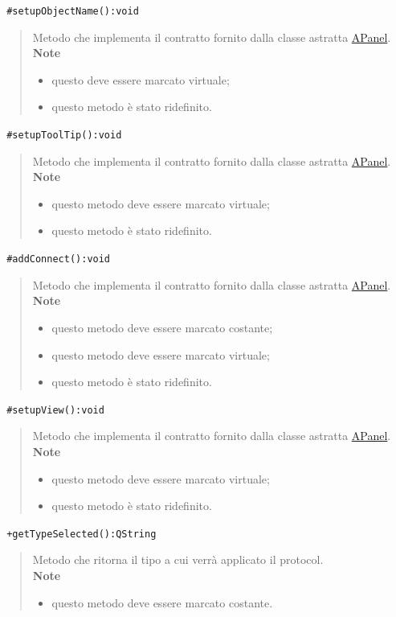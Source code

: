 \color{blue}\verb! #setupObjectName():void!
\begin{quote}
\color{black}Metodo che implementa il contratto fornito dalla classe astratta \hyperref[speAPanel]{APanel}.\\
 \textbf{Note}
 \begin{itemize}
  \item questo deve essere marcato virtuale;
 \item questo metodo è stato ridefinito.
 \end{itemize}
\end{quote} 
\color{blue}\verb! #setupToolTip():void!
\begin{quote}
\color{black}Metodo che implementa il contratto fornito dalla classe astratta \hyperref[speAPanel]{APanel}.\\
 \textbf{Note}
 \begin{itemize}
 \item questo metodo deve essere marcato virtuale;
 \item questo metodo è stato ridefinito.
 \end{itemize}
\end{quote} 
\color{blue}\verb! #addConnect():void!
\begin{quote}
\color{black}Metodo che implementa il contratto fornito dalla classe astratta \hyperref[speAPanel]{APanel}.\\
 \textbf{Note}
 \begin{itemize}
 \item questo metodo deve essere marcato costante;
 \item questo metodo deve essere marcato virtuale;
 \item questo metodo è stato ridefinito.
 \end{itemize}
\end{quote} 
\color{blue}\verb! #setupView():void!
\begin{quote}
\color{black}Metodo che implementa il contratto fornito dalla classe astratta \hyperref[speAPanel]{APanel}.\\
 \textbf{Note}
 \begin{itemize}
 \item questo metodo deve essere marcato virtuale;
 \item questo metodo è stato ridefinito.
 \end{itemize}
\end{quote}
\color{blue}\verb! +getTypeSelected():QString!
\begin{quote}
\color{black} Metodo che ritorna il tipo a cui verrà applicato il protocol\g{}.  \\
 \textbf{Note}
 \begin{itemize}
 \item questo metodo deve essere marcato costante.
 \end{itemize}
\end{quote}
